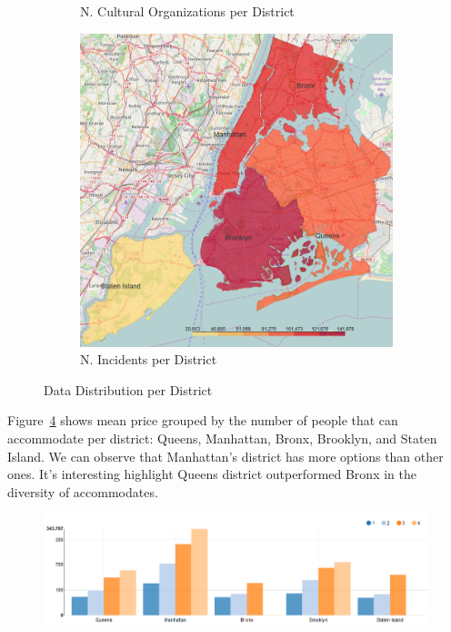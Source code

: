 \documentclass[sigconf]{acmart}
\begin{document}
\begin{figure}[!htpb]
\begin{subfigure}{0.5\textwidth}
		\caption{N. Cultural Organizations per District}
		\label{fig:datadistribution:cultural}
	\end{subfigure}
	\hfill
	\begin{subfigure}{0.5\textwidth}
		\centering
		\includegraphics[scale=0.27]{images/incidents_per_district}
		\caption{N. Incidents per District}
		\label{fig:datadistribution:incidents}
	\end{subfigure}
	
	\caption{Data Distribution per District}	
	\label{fig:datadistribution}
\end{figure}

Figure~\ref{fig:meanpriceperaccomodate} shows mean price grouped by the number of people that can accommodate per district: Queens, Manhattan, Bronx, Brooklyn, and Staten Island. We can observe that Manhattan's district has more options than other ones. It's interesting highlight Queens district outperformed Bronx in the diversity of accommodates. 

\begin{figure}[!htpb]
	\centering
	\includegraphics[width=\linewidth]{images/mean_price_per_accomodate}
	\caption{}
	\label{fig:meanpriceperaccomodate}
\end{figure}
\end{document}
